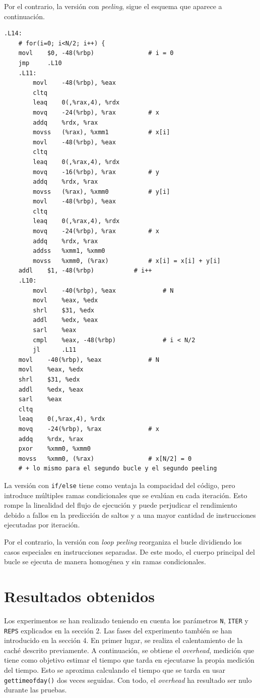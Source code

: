 \documentclass[11pt,a4paper,twoside]{article}
\theoremstyle{definition}
\begin{document}
	Por el contrario, la versión con \textit{peeling}, sigue el esquema que aparece a continuación.
	
	\begin{verbatim}
.L14:
	# for(i=0; i<N/2; i++) {
	movl    $0, -48(%rbp)               # i = 0
	jmp     .L10
	.L11:
		movl    -48(%rbp), %eax
		cltq
		leaq    0(,%rax,4), %rdx
		movq    -24(%rbp), %rax         # x
		addq    %rdx, %rax
		movss   (%rax), %xmm1           # x[i]
		movl    -48(%rbp), %eax
		cltq
		leaq    0(,%rax,4), %rdx
		movq    -16(%rbp), %rax         # y
		addq    %rdx, %rax
		movss   (%rax), %xmm0           # y[i]
		movl    -48(%rbp), %eax
		cltq
		leaq    0(,%rax,4), %rdx
		movq    -24(%rbp), %rax         # x
		addq    %rdx, %rax
		addss   %xmm1, %xmm0
		movss   %xmm0, (%rax)           # x[i] = x[i] + y[i]
	addl    $1, -48(%rbp)           # i++
	.L10:
		movl    -40(%rbp), %eax             # N
		movl    %eax, %edx
		shrl    $31, %edx
		addl    %edx, %eax
		sarl    %eax
		cmpl    %eax, -48(%rbp)             # i < N/2
		jl      .L11
	movl    -40(%rbp), %eax             # N
	movl    %eax, %edx
	shrl    $31, %edx
	addl    %edx, %eax
	sarl    %eax
	cltq
	leaq    0(,%rax,4), %rdx
	movq    -24(%rbp), %rax             # x
	addq    %rdx, %rax
	pxor    %xmm0, %xmm0
	movss   %xmm0, (%rax)               # x[N/2] = 0
	# + lo mismo para el segundo bucle y el segundo peeling
	\end{verbatim}
	
	La versión con \texttt{if/else} tiene como ventaja la compacidad del código, pero introduce múltiples ramas condicionales que se evalúan en cada iteración. Esto rompe la linealidad del flujo de ejecución y puede perjudicar el rendimiento debido a fallos en la predicción de saltos y a una mayor cantidad de instrucciones ejecutadas por iteración.
	
	Por el contrario, la versión con \textit{loop peeling} reorganiza el bucle dividiendo los casos especiales en instrucciones separadas. De este modo, el cuerpo principal del bucle se ejecuta de manera homogénea y sin ramas condicionales.
											
	
	\section{Resultados obtenidos}
	
	Los experimentos se han realizado teniendo en cuenta los parámetros \texttt{N}, \texttt{ITER} y \texttt{REPS} explicados en la sección 2. Las fases del experimento también se han introducido en la sección 4. En primer lugar, se realiza el calentamiento de la caché descrito previamente. A continuación, se obtiene el \textit{overhead}, medición que tiene como objetivo estimar el tiempo que tarda en ejecutarse la propia medición del tiempo. Esto se aproxima calculando el tiempo que se tarda en usar \texttt{gettimeofday()} dos veces seguidas. Con todo, el \textit{overhead} ha resultado ser nulo durante las pruebas.
	
\end{document}
